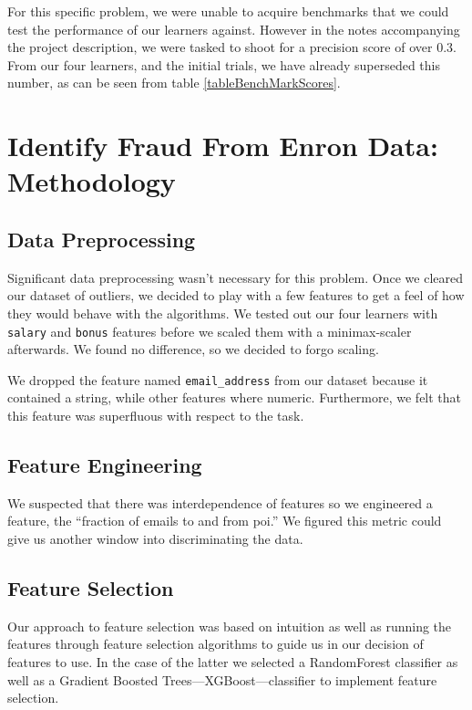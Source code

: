 \documentclass[twoside,openright,titlepage,numbers=noenddot,headinclude,%
               footinclude=true,cleardoublepage=empty,abstractoff,BCOR=5mm,%
               paper=a4,fontsize=11pt,ngerman,american]{scrreprt}
\numberwithin{theorem}{chapter}
\numberwithin{definition}{chapter}
\numberwithin{algorithm}{chapter}
\numberwithin{figure}{chapter}
\numberwithin{table}{chapter}
\numberwithin{equation}{chapter}
\begin{document}
For this specific problem, we were unable to acquire benchmarks that we could test the performance of our learners against. However in the notes accompanying the project description, we were tasked to shoot for a precision score of over 0.3. From our four learners, and the initial trials, we have already superseded this number, as can be seen from table \ref{tableBenchMarkScores}.


\chapter*{Identify Fraud From Enron Data: Methodology}

\section*{Data Preprocessing}
Significant data preprocessing wasn't necessary for this problem. Once we cleared our dataset of outliers, we decided to play with a few features to get a feel of how they would behave with the algorithms. We tested out our four learners with \texttt{salary} and \texttt{bonus} features before we scaled them with a minimax-scaler afterwards. We found no difference, so we decided to forgo scaling.

We dropped the feature named \texttt{email\_address} from our dataset because it contained a string, while other features where numeric. Furthermore, we felt that this feature was superfluous with respect to the task. 

\section*{Feature Engineering}
We suspected that there was interdependence of features so we engineered a feature, the ``fraction of emails to and from poi.'' We figured this metric could give us another window into discriminating the data. 

\section*{Feature Selection}
Our approach to feature selection was based on intuition as well as running the features through feature selection algorithms to guide us in our decision of features to use. In the case of the latter we selected a RandomForest classifier as well as a Gradient Boosted Trees---XGBoost---classifier to implement feature selection.
\end{document}
